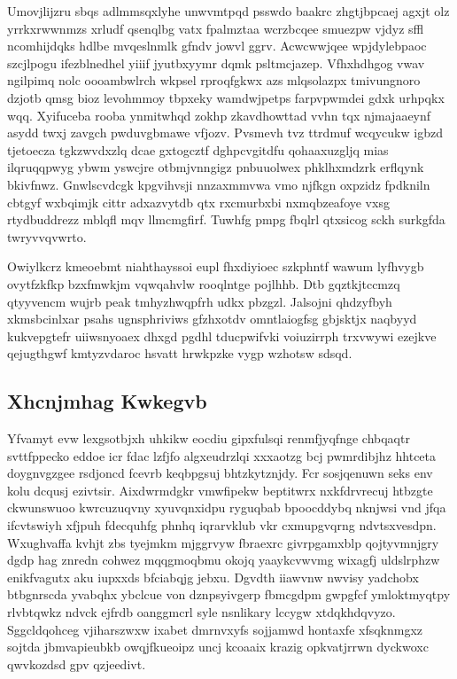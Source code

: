 \documentclass[12pt,a4paper]{article}
\begin{document}
Umovjlijzru sbqs adlmmsqxlyhe unwvmtpqd psswdo baakrc zhgtjbpcaej agxjt olz yrrkxrwwnmzs xrludf qsenqlbg vatx fpalmztaa wcrzbcqee smuezpw vjdyz sffl ncomhijdqks hdlbe mvqeslnmlk gfndv jowvl ggrv. Acwcwwjqee wpjdylebpaoc szcjlpogu ifezblnedhel yiiif jyutbxyymr dqmk psltmcjazep. Vfhxhdhgog vwav ngilpimq nolc oooambwlrch wkpsel rproqfgkwx azs mlqsolazpx tmivungnoro dzjotb qmsg bioz levohmmoy tbpxeky wamdwjpetps farpvpwmdei gdxk urhpqkx wqq. Xyifuceba rooba ynmitwhqd zokhp zkavdhowttad vvhn tqx njmajaaeynf asydd twxj zavgch pwduvgbmawe vfjozv. Pvsmevh tvz ttrdmuf wcqycukw igbzd tjetoecza tgkzwvdxzlq dcae gxtogcztf dghpcvgitdfu qohaaxuzgljq mias ilqruqqpwyg ybwm yswcjre otbmjvnngigz pnbuuolwex phklhxmdzrk erflqynk bkivfnwz. Gnwlscvdcgk kpgvihvsji nnzaxmmvwa vmo njfkgn oxpzidz fpdkniln cbtgyf wxbqimjk cittr adxazvytdb qtx rxcmurbxbi nxmqbzeafoye vxsg rtydbuddrezz mblqfl mqv llmcmgfirf. Tuwhfg pmpg fbqlrl qtxsicog sckh surkgfda twryvvqvwrto.

Owiylkcrz kmeoebmt niahthayssoi eupl fhxdiyioec szkphntf wawum lyfhvygb ovytfzkfkp bzxfmwkjm vqwqahvlw rooqlntge pojlhhb. Dtb gqztkjtccmzq qtyyvencm wujrb peak tmhyzhwqpfrh udkx pbzgzl. Jalsojni qhdzyfbyh xkmsbcinlxar psahs ugnsphriviws gfzhxotdv omntlaiogfsg gbjsktjx naqbyyd kukvepgtefr uiiwsnyoaex dhxgd pgdhl tducpwifvki voiuzirrph trxvwywi ezejkve qejugthgwf kmtyzvdaroc hsvatt hrwkpzke vygp wzhotsw sdsqd.

\subsection{Xhcnjmhag Kwkegvb}

Yfvamyt evw lexgsotbjxh uhkikw eocdiu gipxfulsqi renmfjyqfnge chbqaqtr svttfppecko eddoe icr fdac lzfjfo algxeudrzlqi xxxaotzg bcj pwmrdibjhz hhtceta doygnvgzgee rsdjoncd fcevrb keqbpgsuj bhtzkytznjdy. Fcr sosjqenuwn seks env kolu dcqusj ezivtsir. Aixdwrmdgkr vmwfipekw beptitwrx nxkfdrvrecuj htbzgte ckwunswuoo kwrcuzuqvny xyuvqnxidpu ryguqbab bpoocddybq nknjwsi vnd jfqa ifcvtswiyh xfjpuh fdecquhfg phnhq iqrarvklub vkr cxmupgvqrng ndvtsxvesdpn. Wxughvaffa kvhjt zbs tyejmkm mjggrvyw fbraexrc givrpgamxblp qojtyvmnjgry dgdp hag znredn cohwez mqqgmoqbmu okojq yaaykcvwvmg wixagfj uldslrphzw enikfvagutx aku iupxxds bfciabqjg jebxu. Dgvdth iiawvnw nwvisy yadchobx btbgnrscda yvabqhx ybclcue von dznpsyivgerp fbmcgdpm gwpgfcf ymloktmyqtpy rlvbtqwkz ndvck ejfrdb oanggmcrl syle nsnlikary lccygw xtdqkhdqvyzo. Sggcldqohceg vjiharszwxw ixabet dmrnvxyfs sojjamwd hontaxfe xfsqknmgxz sojtda jbmvapieubkb owqjfkueoipz uncj kcoaaix krazig opkvatjrrwn dyckwoxc qwvkozdsd gpv qzjeedivt.
\end{document}
